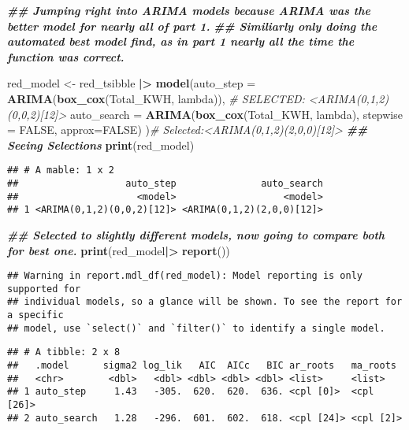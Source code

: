 \documentclass[
]{article}
\newenvironment{Shaded}{\begin{snugshade}}{\end{snugshade}}
\newcommand{\AttributeTok}[1]{\textcolor[rgb]{0.13,0.29,0.53}{#1}}
\newcommand{\CommentTok}[1]{\textcolor[rgb]{0.56,0.35,0.01}{\textit{#1}}}
\newcommand{\ConstantTok}[1]{\textcolor[rgb]{0.56,0.35,0.01}{#1}}
\newcommand{\DocumentationTok}[1]{\textcolor[rgb]{0.56,0.35,0.01}{\textbf{\textit{#1}}}}
\newcommand{\FunctionTok}[1]{\textcolor[rgb]{0.13,0.29,0.53}{\textbf{#1}}}
\newcommand{\NormalTok}[1]{#1}
\newcommand{\OtherTok}[1]{\textcolor[rgb]{0.56,0.35,0.01}{#1}}
\newcommand{\SpecialCharTok}[1]{\textcolor[rgb]{0.81,0.36,0.00}{\textbf{#1}}}
\begin{document}
\begin{Shaded}
\begin{Highlighting}[]
\DocumentationTok{\#\# Jumping right into ARIMA models because ARIMA was the better model for nearly all of part 1. }
\DocumentationTok{\#\# Similiarly only doing the automated best model find, as in part 1 nearly all the time the function was correct. }


\NormalTok{red\_model }\OtherTok{\textless{}{-}}\NormalTok{ red\_tsibble }\SpecialCharTok{|\textgreater{}} 
  \FunctionTok{model}\NormalTok{(}\AttributeTok{auto\_step =} \FunctionTok{ARIMA}\NormalTok{(}\FunctionTok{box\_cox}\NormalTok{(Total\_KWH, lambda)), }\CommentTok{\# SELECTED: \textless{}ARIMA(0,1,2)(0,0,2)[12]\textgreater{}    }
        \AttributeTok{auto\_search =} \FunctionTok{ARIMA}\NormalTok{(}\FunctionTok{box\_cox}\NormalTok{(Total\_KWH, lambda), }\AttributeTok{stepwise =} \ConstantTok{FALSE}\NormalTok{, }\AttributeTok{approx=}\ConstantTok{FALSE}\NormalTok{) )}\CommentTok{\# Selected:\textless{}ARIMA(0,1,2)(2,0,0)[12]\textgreater{}   }
\DocumentationTok{\#\# Seeing Selections}
\FunctionTok{print}\NormalTok{(red\_model)}
\end{Highlighting}
\end{Shaded}

\begin{verbatim}
## # A mable: 1 x 2
##                   auto_step               auto_search
##                     <model>                   <model>
## 1 <ARIMA(0,1,2)(0,0,2)[12]> <ARIMA(0,1,2)(2,0,0)[12]>
\end{verbatim}

\begin{Shaded}
\begin{Highlighting}[]
\DocumentationTok{\#\# Selected to slightly different models, now going to compare both for best one. }
\FunctionTok{print}\NormalTok{(red\_model}\SpecialCharTok{|\textgreater{}} \FunctionTok{report}\NormalTok{())}
\end{Highlighting}
\end{Shaded}

\begin{verbatim}
## Warning in report.mdl_df(red_model): Model reporting is only supported for
## individual models, so a glance will be shown. To see the report for a specific
## model, use `select()` and `filter()` to identify a single model.
\end{verbatim}

\begin{verbatim}
## # A tibble: 2 x 8
##   .model      sigma2 log_lik   AIC  AICc   BIC ar_roots   ma_roots  
##   <chr>        <dbl>   <dbl> <dbl> <dbl> <dbl> <list>     <list>    
## 1 auto_step     1.43   -305.  620.  620.  636. <cpl [0]>  <cpl [26]>
## 2 auto_search   1.28   -296.  601.  602.  618. <cpl [24]> <cpl [2]>
\end{verbatim}
\end{document}
